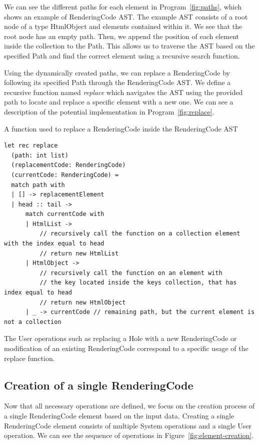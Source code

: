 We can see the different paths for each element in Program~\ref{fig:paths}, which shows an example of RenderingCode AST.
The example AST consists of a root node of a type HtmlObject and elements contained within it.
We see that the root node has an empty path.
Then, we append the position of each element inside the collection to the Path.
This allows us to traverse the AST based on the specified Path and find the correct element using a recursive search function.

Using the dynamically created paths, we can replace a RenderingCode by following its specified Path through the RenderingCode AST.
We define a recursive function named \emph{replace} which navigates the AST using the provided path to locate and replace a specific element with a new one.
We can see a description of the potential implementation in Program~\ref{fig:replace}.

\begin{listing}[htbp]
	\caption {A function used to replace a RenderingCode inside the RenderingCode AST}
	\label{fig:replace}
	\begin{lstlisting}
let rec replace 
  (path: int list) 
  (replacementCode: RenderingCode) 
  (currentCode: RenderingCode) =
  match path with
  | [] -> replacementElement
  | head :: tail ->
      match currentCode with
      | HtmlList ->
          // recursively call the function on a collection element with the index equal to head 
          // return new HtmlList
      | HtmlObject ->
          // recursively call the function on an element with 
          // the key located inside the keys collection, that has index equal to head
          // return new HtmlObject
      | _ -> currentCode // remaining path, but the current element is not a collection
  \end{lstlisting}
\end{listing}

The User operations such as replacing a Hole with a new RenderingCode or modification of an existing RenderingCode correspond to a specific usage of the replace function.

\subsection{Creation of a single RenderingCode}

Now that all necessary operations are defined, we focus on the creation process of a single RenderingCode element based on the input data.
Creating a single RenderingCode element consists of multiple System operations and a single User operation.
We can see the sequence of operations in Figure~\ref{fig:element-creation}.

